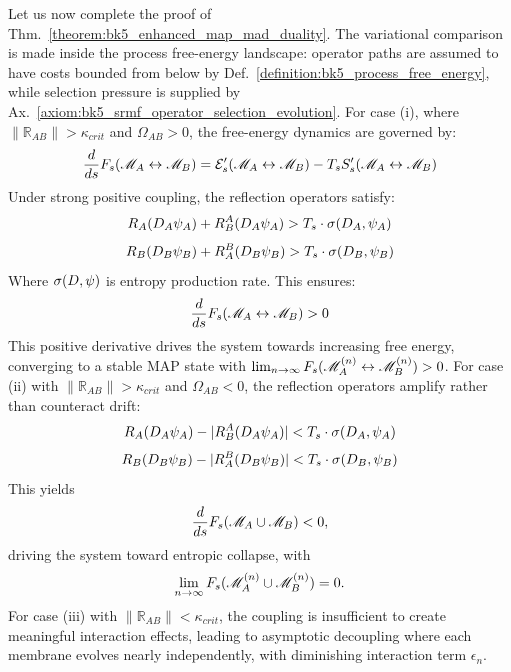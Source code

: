\begin{theorem} \label{theorem:bk5_enhanced_map_mad_duality_pr} 

\leavevmode\newline
Let us now complete the proof of Thm.~\ref{theorem:bk5_enhanced_map_mad_duality}.
The variational comparison is made inside the process free-energy landscape:
operator paths are assumed to have costs bounded from below by
Def.~\ref{definition:bk5_process_free_energy}, while selection pressure is
supplied by Ax.~\ref{axiom:bk5_srmf_operator_selection_evolution}.
For case (i), where $\|\mathbb{R}_{AB}\| > \kappa_{crit}$ and $\Omega_{AB} > 0$,
the free-energy dynamics are governed by:
\begin{equation}
\frac{d}{ds}F_s(\mathscr{M}_A \leftrightarrow \mathscr{M}_B) = \mathcal{E}_s'(\mathscr{M}_A \leftrightarrow \mathscr{M}_B) - T_s S_s'(\mathscr{M}_A \leftrightarrow \mathscr{M}_B)
\end{equation}
Under strong positive coupling, the reflection operators satisfy:
\begin{equation}
R_A(D_A \psi_A) + R_B^A(D_A \psi_A) > T_s \cdot \sigma(D_A, \psi_A)
\end{equation}
\begin{equation}
R_B(D_B \psi_B) + R_A^B(D_B \psi_B) > T_s \cdot \sigma(D_B, \psi_B)
\end{equation}
Where $\sigma(D, \psi)$ is entropy production rate. This ensures:
\begin{equation}
\frac{d}{ds}F_s(\mathscr{M}_A \leftrightarrow \mathscr{M}_B) > 0
\end{equation}
This positive derivative drives the system towards increasing free energy, converging to a stable MAP state with $\lim_{n \to \infty} F_s(\mathscr{M}_A^{(n)} \leftrightarrow \mathscr{M}_B^{(n)}) > 0$.
For case (ii) with $\|\mathbb{R}_{AB}\| > \kappa_{crit}$ and $\Omega_{AB} < 0$, the reflection operators amplify rather than counteract drift:
\begin{equation}
R_A(D_A \psi_A) - |R_B^A(D_A \psi_A)| < T_s \cdot \sigma(D_A, \psi_A)
\end{equation}
\begin{equation}
R_B(D_B \psi_B) - |R_A^B(D_B \psi_B)| < T_s \cdot \sigma(D_B, \psi_B)
\end{equation}
This yields
\[
\frac{d}{ds} F_s(\mathscr{M}_A \cup \mathscr{M}_B) < 0,
\]
driving the system toward entropic collapse, with
\[
\lim_{n \to \infty} F_s(\mathscr{M}_A^{(n)} \cup \mathscr{M}_B^{(n)}) = 0.
\]
For case (iii) with $\|\mathbb{R}_{AB}\| < \kappa_{crit}$, the coupling is insufficient to create meaningful interaction effects, leading to asymptotic decoupling where each membrane evolves nearly independently, with diminishing interaction term $\epsilon_n$.
\end{theorem}
